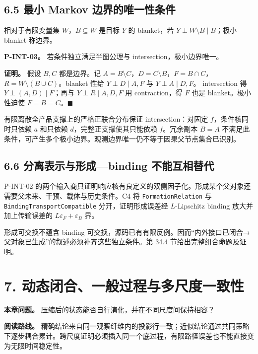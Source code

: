 \documentclass[
  11pt,
  oneside]{book}
\begin{document}
\section{6.5 最小 Markov 边界的唯一性条件}\label{ux6700ux5c0f-markov-ux8fb9ux754cux7684ux552fux4e00ux6027ux6761ux4ef6}

相对于有限变量集 \(W\)，\(B\subseteq W\) 是目标 \(Y\) 的 blanket，若 \(Y\perp W\setminus B\mid B\)；极小 blanket 称边界。

\hypertarget{p-int-03}{}\label{p-int-03}

\textbf{P-INT-03。} 若条件独立满足半图公理与 intersection，极小边界唯一。

\textbf{证明。} 假设 \(B,C\) 都是边界。记 \(A=B\setminus C\)，\(D=C\setminus B\)，\(F=B\cap C\)，\(R=W\setminus(B\cup C)\)。blanket 性给 \(Y\perp D\mid A,F\) 与 \(Y\perp A\mid D,F\)。 intersection 得 \(Y\perp(A,D)\mid F\)；再与 \(Y\perp R\mid A,D,F\) 用 contraction，得 \(F\) 也是 blanket。极小性迫使 \(F=B=C\)。\(\blacksquare\)

有限离散全产品支撑上的严格正联合分布保证 intersection：对固定 \(f\)，条件核同时只依赖 \(a\) 和只依赖 \(d\)，完整正支撑使其只能依赖 \(f\)。冗余副本 \(B=A\) 不满足此条件，可产生多个极小边界。观测边界唯一仍不等于因果父节点集合已识别。

\section{6.6 分离表示与形成---binding 不能互相替代}\label{ux5206ux79bbux8868ux793aux4e0eux5f62ux6210binding-ux4e0dux80fdux4e92ux76f8ux66ffux4ee3}

P-INT-02 的两个输入商只证明响应核有良定义的双侧因子化。形成某个父对象还需要父未来、干预、载体与历史条件。C4 将 \nolinkurl{FormationRelation} 与 \nolinkurl{BindingTransportCompatible} 分开，证明形成误差经 \(L\)-Lipschitz binding 放大并加上传输误差的 \(L\varepsilon_F+\varepsilon_B\) 界。

形成可交换不蕴含 binding 可交换，源码已有有限反例。因而``内外接口已闭合→父对象已生成''的叙述必须补齐这些独立条件。第 34.4 节给出完整组合命题及证明。

\chapter{7. 动态闭合、一般过程与多尺度一致性}\label{ch-7}

\textbf{本章问题。} 压缩后的状态能否自行演化，并在不同尺度间保持相容？

\textbf{阅读路线。} 精确结论来自同一观察纤维内的投影行一致；近似结论通过共同策略下逐步耦合累计。跨尺度证明必须插入同一个底过程，有限路径误差也不能直接变为无限时间稳定性。
\end{document}
